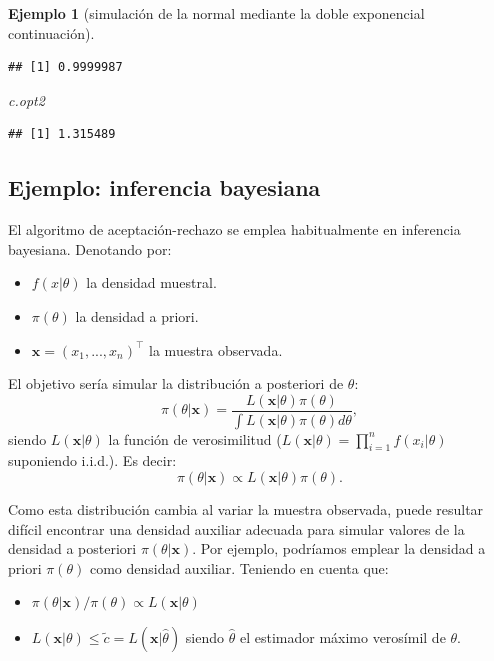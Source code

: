 \documentclass[
]{book}
\newenvironment{Shaded}{\begin{snugshade}}{\end{snugshade}}
\newcommand{\NormalTok}[1]{#1}
\theoremstyle{break}
\newtheorem{example}{Ejemplo}[chapter]
\theoremstyle{nonumberplain}
\begin{document}
\begin{example}[simulación de la normal mediante la doble exponencial continuación]
\begin{verbatim}
## [1] 0.9999987
\end{verbatim}

\begin{Shaded}
\begin{Highlighting}[]
\NormalTok{c.opt2}
\end{Highlighting}
\end{Shaded}

\begin{verbatim}
## [1] 1.315489
\end{verbatim}

\end{example}

\hypertarget{bayes-ar}{%
\subsection{Ejemplo: inferencia bayesiana}\label{bayes-ar}}

El algoritmo de aceptación-rechazo se emplea habitualmente en inferencia bayesiana.
Denotando por:

\begin{itemize}
\item
  \(f(x|\theta)\) la densidad muestral.
\item
  \(\pi(\theta)\) la densidad a priori.
\item
  \(\mathbf{x}=(x_1,...,x_n)^{\top}\) la muestra observada.
\end{itemize}

El objetivo sería simular la distribución a posteriori de \(\theta\):
\[\pi(\theta|\mathbf{x}) = \frac{L(\mathbf{x}|\theta)\pi(\theta)}{\int L(\mathbf{x}|\theta)\pi(\theta)d\theta},\]
siendo \(L(\mathbf{x}|\theta)\) la función de verosimilitud (\(L(\mathbf{x}|\theta) = \prod\limits_{i=1}^{n}f(x_i|\theta)\) suponiendo i.i.d.).
Es decir:
\[\pi(\theta | \mathbf{x})\propto L(\mathbf{x}| \theta)\pi(\theta).\]

Como esta distribución cambia al variar la muestra observada, puede resultar difícil encontrar una densidad auxiliar adecuada para simular valores de la densidad a posteriori \(\pi(\theta|\mathbf{x})\).
Por ejemplo, podríamos emplear la densidad a priori \(\pi(\theta)\) como densidad auxiliar.
Teniendo en cuenta que:

\begin{itemize}
\item
  \(\pi(\theta |\mathbf{x})/\pi(\theta)\propto L(\mathbf{x}|\theta)\)
\item
  \(L(\mathbf{x}|\theta)\leq \tilde{c}=L(\mathbf{x}|\hat{\theta})\) siendo
  \(\hat{\theta}\) el estimador máximo verosímil de \(\theta\).
\end{itemize}
\end{document}
